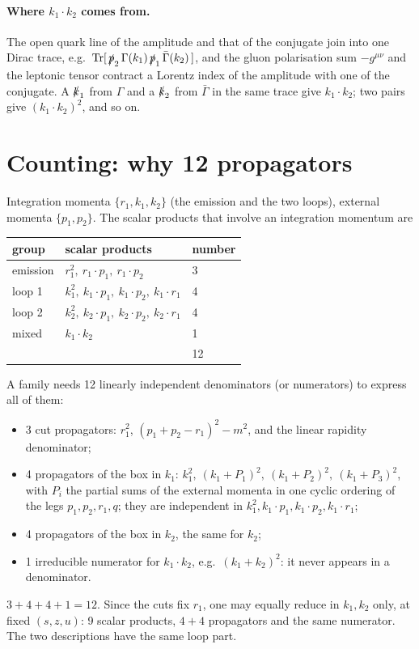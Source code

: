 \documentclass[11pt,a4paper]{article}
\begin{document}
\paragraph{Where $k_1\cdot k_2$ comes from.} The open quark line of the amplitude and that of the conjugate join into
one Dirac trace, e.g.\ $\mathrm{Tr}[\,\slashed{p}_2\,\Gamma(k_1)\,\slashed{p}_1\,\bar\Gamma(k_2)\,]$, and the gluon
polarisation sum $-g^{\mu\nu}$ and the leptonic tensor contract a Lorentz index of the amplitude with one of the
conjugate. A $\slashed{k}_1$ from $\Gamma$ and a $\slashed{k}_2$ from $\bar\Gamma$ in the same trace give $k_1\cdot k_2$;
two pairs give $(k_1\cdot k_2)^2$, and so on.

\section{Counting: why 12 propagators}\label{sec:count}

Integration momenta $\{r_1,k_1,k_2\}$ (the emission and the two loops), external momenta $\{p_1,p_2\}$.
The scalar products that involve an integration momentum are
\begin{center}
\begin{tabular}{lll}
\toprule
group & scalar products & number \\
\midrule
emission & $r_1^2,\ r_1\cdot p_1,\ r_1\cdot p_2$ & 3 \\
loop 1 & $k_1^2,\ k_1\cdot p_1,\ k_1\cdot p_2,\ k_1\cdot r_1$ & 4 \\
loop 2 & $k_2^2,\ k_2\cdot p_1,\ k_2\cdot p_2,\ k_2\cdot r_1$ & 4 \\
mixed & $k_1\cdot k_2$ & 1 \\
\midrule
 & & 12 \\
\bottomrule
\end{tabular}
\end{center}
A family needs 12 linearly independent denominators (or numerators) to express all of them:
\begin{itemize}
\item 3 cut propagators: $r_1^2$, $(p_1+p_2-r_1)^2-m^2$, and the linear rapidity denominator;
\item 4 propagators of the box in $k_1$: $k_1^2,\ (k_1+P_1)^2,\ (k_1+P_2)^2,\ (k_1+P_3)^2$, with $P_i$ the partial sums
of the external momenta in one cyclic ordering of the legs $p_1,p_2,r_1,q$; they are independent in
$k_1^2,k_1\cdot p_1,k_1\cdot p_2,k_1\cdot r_1$;
\item 4 propagators of the box in $k_2$, the same for $k_2$;
\item 1 irreducible numerator for $k_1\cdot k_2$, e.g.\ $(k_1+k_2)^2$: it never appears in a denominator.
\end{itemize}
$3+4+4+1=12$. Since the cuts fix $r_1$, one may equally reduce in $k_1,k_2$ only, at fixed $(s,z,u)$: 9 scalar
products, $4+4$ propagators and the same numerator. The two descriptions have the same loop part.
\end{document}

